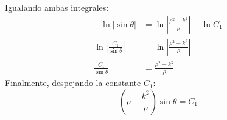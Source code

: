 \documentclass[12pt,letterpaper]{article}
\begin{document}
Igualando ambas integrales:
\begin{align*}
  -\ln|\sin\theta| &= \ln\left|\frac{\rho^2-k^2}{\rho}\right| - \ln C_1 \\
  \ln\left|\frac{C_1}{\sin\theta}\right| &= \ln\left|\frac{\rho^2-k^2}{\rho}\right| \\
  \frac{C_1}{\sin\theta} &= \frac{\rho^2-k^2}{\rho}
\end{align*}
Finalmente, despejando la constante $C_1$:
\[
  \left(\rho - \frac{k^2}{\rho}\right)\sin\theta = C_1
\]
\end{document}
